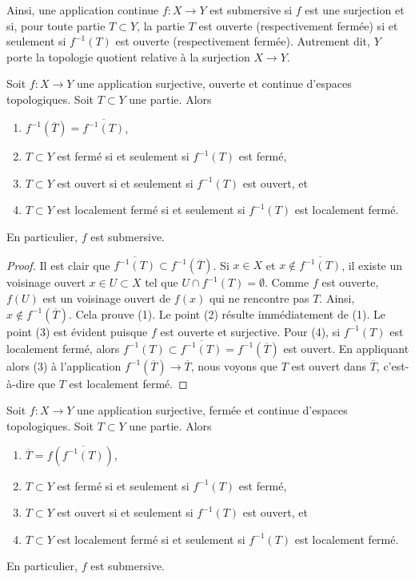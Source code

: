 \noindent
Ainsi, une application continue $f : X \to Y$ est submersive si $f$ est une
surjection et si, pour toute partie $T \subset Y$, la partie $T$ est ouverte
(respectivement fermée) si et seulement si $f^{-1}(T)$ est ouverte
(respectivement fermée). Autrement dit, $Y$ porte la
topologie quotient relative à la surjection $X \to Y$.

\begin{lemma}
\label{lemma-open-morphism-quotient-topology}
Soit $f : X \to Y$ une application surjective, ouverte et continue d'espaces
topologiques. Soit $T \subset Y$ une partie. Alors
\begin{enumerate}
\item $f^{-1}(\overline{T}) = \overline{f^{-1}(T)}$,
\item $T \subset Y$ est fermé si et seulement si $f^{-1}(T)$ est fermé,
\item $T \subset Y$ est ouvert si et seulement si $f^{-1}(T)$ est ouvert, et
\item $T \subset Y$ est localement fermé si et seulement si $f^{-1}(T)$
est localement fermé.
\end{enumerate}
En particulier, $f$ est submersive.
\end{lemma}

\begin{proof}
Il est clair que $\overline{f^{-1}(T)} \subset f^{-1}(\overline{T})$.
Si $x \in X$ et $x \not \in \overline{f^{-1}(T)}$, il existe un voisinage
ouvert $x \in U \subset X$ tel que $U \cap f^{-1}(T) = \emptyset$.
Comme $f$ est ouverte, $f(U)$ est un voisinage ouvert de $f(x)$ qui ne
rencontre pas $T$. Ainsi, $x \not \in f^{-1}(\overline{T})$. Cela prouve (1).
Le point (2) résulte immédiatement de (1).
Le point (3) est évident puisque $f$ est ouverte et surjective.
Pour (4), si $f^{-1}(T)$ est localement fermé, alors
$f^{-1}(T) \subset \overline{f^{-1}(T)} = f^{-1}(\overline{T})$
est ouvert. En appliquant alors (3) à l'application
$f^{-1}(\overline{T}) \to \overline{T}$, nous voyons que $T$ est ouvert
dans $\overline{T}$, c'est-à-dire que $T$ est localement fermé.
\end{proof}

\begin{lemma}
\label{lemma-closed-morphism-quotient-topology}
Soit $f : X \to Y$ une application surjective, fermée et continue d'espaces
topologiques. Soit $T \subset Y$ une partie. Alors
\begin{enumerate}
\item $\overline{T} = f(\overline{f^{-1}(T)})$,
\item $T \subset Y$ est fermé si et seulement si $f^{-1}(T)$ est fermé,
\item $T \subset Y$ est ouvert si et seulement si $f^{-1}(T)$ est ouvert, et
\item $T \subset Y$ est localement fermé si et seulement si
$f^{-1}(T)$ est localement fermé.
\end{enumerate}
En particulier, $f$ est submersive.
\end{lemma}

